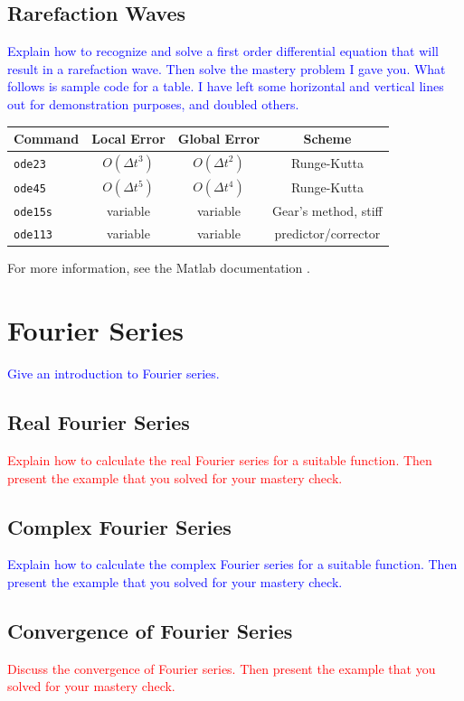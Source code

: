 \documentclass{article}
\newcommand{\red}[1]{\textcolor{red}{#1}}
\newcommand{\blue}[1]{\textcolor{blue}{#1}}
\begin{document}
\subsection{Rarefaction Waves}
\blue{Explain how to recognize and solve a first order differential equation that will result in a rarefaction wave. Then solve the mastery problem I gave you. What follows is sample code for a table. I have left some horizontal and vertical lines out for demonstration purposes, and doubled others.}
\begin{center}
\begin{tabular}{|l|ccc|} \hline
\textbf{Command} & \textbf{Local Error} & \textbf{Global Error} & \textbf{Scheme} \\ \hline \hline  
  \texttt{ode23} & $O(\Delta t^3)$ & $O(\Delta t^2)$ & Runge-Kutta\\
  \texttt{ode45} & $O(\Delta t^5)$ & $O(\Delta t^4)$ & Runge-Kutta \\ \hline
  \texttt{ode15s} & variable  & variable & Gear's method, stiff\\
  \texttt{ode113} & variable & variable & predictor/corrector \\ \hline
  \end{tabular}
  \end{center}
For more information, see the Matlab documentation \cite{matlabode}.

\section{Fourier Series}
\blue{Give an introduction to Fourier series.}

\subsection{Real Fourier Series}
\red{Explain how to calculate the real Fourier series for a suitable function. Then present the example that you solved for your mastery check.}

\subsection{Complex Fourier Series}
\blue{Explain how to calculate the complex Fourier series for a suitable function. Then present the example that you solved for your mastery check.}

\subsection{Convergence of Fourier Series}
\red{Discuss the convergence of Fourier series. Then present the example that you solved for your mastery check.}
\end{document}
